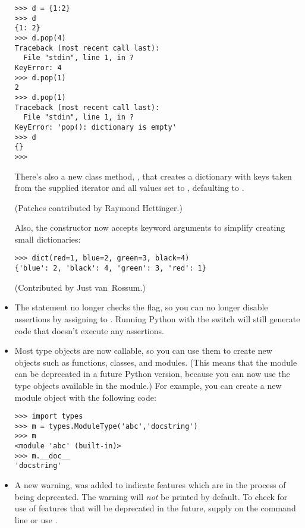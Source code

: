 \documentclass{howto}
\begin{document}
\begin{itemize}
\begin{verbatim}
>>> d = {1:2}
>>> d
{1: 2}
>>> d.pop(4)
Traceback (most recent call last):
  File "stdin", line 1, in ?
KeyError: 4
>>> d.pop(1)
2
>>> d.pop(1)
Traceback (most recent call last):
  File "stdin", line 1, in ?
KeyError: 'pop(): dictionary is empty'
>>> d
{}
>>>
\end{verbatim}

There's also a new class method, 
, that 
creates a dictionary with keys taken from the supplied iterator
 and all values set to , defaulting to
.  

(Patches contributed by Raymond Hettinger.)

Also, the  constructor now accepts keyword arguments to
simplify creating small dictionaries:

\begin{verbatim}
>>> dict(red=1, blue=2, green=3, black=4)
{'blue': 2, 'black': 4, 'green': 3, 'red': 1}    
\end{verbatim}

(Contributed by Just van~Rossum.)       

\item The  statement no longer checks the 
flag, so you can no longer disable assertions by assigning to .
Running Python with the  switch will still generate
code that doesn't execute any assertions.

\item Most type objects are now callable, so you can use them
to create new objects such as functions, classes, and modules.  (This
means that the  module can be deprecated in a future
Python version, because you can now use the type objects available in
the  module.)
For example, you can create a new module object with the following code:

\begin{verbatim}
>>> import types
>>> m = types.ModuleType('abc','docstring')
>>> m
<module 'abc' (built-in)>
>>> m.__doc__
'docstring'
\end{verbatim}

\item
A new warning,  was added to
indicate features which are in the process of being
deprecated.  The warning will \emph{not} be printed by default.  To
check for use of features that will be deprecated in the future,
supply  on the
command line or use .


\end{itemize}
\end{document}
